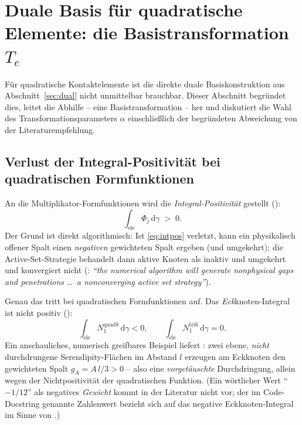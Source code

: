 \documentclass[a4paper,11pt]{article}
\def\bm#1{#1}%
\let\stdsection\section
\renewcommand{\section}{\clearpage\stdsection}
\begin{document}
\section{Duale Basis für quadratische Elemente: die Basistransformation $\bm T_e$}
\label{sec:basistrafo}

Für quadratische Kontaktelemente ist die direkte duale Basiskonstruktion aus
Abschnitt~\ref{sec:dual} nicht unmittelbar brauchbar. Dieser Abschnitt begründet dies, leitet die
Abhilfe -- eine Basistransformation -- her und diskutiert die Wahl des Transformationsparameters
$\alpha$ einschließlich der begründeten Abweichung von der Literaturempfehlung.

\subsection{Verlust der Integral-Positivität bei quadratischen Formfunktionen}
An die Multiplikator-Formfunktionen wird die \emph{Integral-Positivität} gestellt
(\citealp[Gl.~(4.2)]{popp2012}):
\begin{equation}
\int_{\text{ele}} \Phi_j\,\mathrm d\gamma \;>\; 0 .
\label{eq:intpos}
\end{equation}
Der Grund ist direkt algorithmisch: Ist \eqref{eq:intpos} verletzt, kann ein physikalisch offener
Spalt einen \emph{negativen} gewichteten Spalt ergeben (und umgekehrt); die Active-Set-Strategie
behandelt dann aktive Knoten als inaktiv und umgekehrt und konvergiert nicht
(\citealp{popp2012}: \emph{``the numerical algorithm will generate nonphysical gaps and penetrations \ldots\
a nonconverging active set strategy''}).

Genau das tritt bei quadratischen Formfunktionen auf. Das \emph{Eck}knoten-Integral ist nicht positiv
(\citealp[Gl.~(4.3)/(4.4)]{popp2012}):
\begin{equation}
\int_{\text{ele}} N_1^{\text{quad8}}\,\mathrm d\gamma < 0,
\qquad
\int_{\text{ele}} N_1^{\text{tri6}}\,\mathrm d\gamma = 0 .
\end{equation}
Ein anschauliches, numerisch greifbares Beispiel liefert \citet[Gl.~(29)]{puso2008}:
zwei ebene, \emph{nicht} durchdrungene Serendipity-Flächen im Abstand $l$ erzeugen am Eckknoten den
gewichteten Spalt $g_A = A\,l/3 > 0$ -- also eine \emph{vorgetäuschte} Durchdringung, allein wegen
der Nichtpositivität der quadratischen Funktion. (Ein wörtlicher Wert ``$-1/12$'' als negatives
\emph{Gewicht} kommt in der Literatur nicht vor; der im Code-Docstring genannte Zahlenwert bezieht
sich auf das negative Eckknoten-Integral im Sinne von \citet[Gl.~(4.3)]{popp2012}.)
\end{document}
